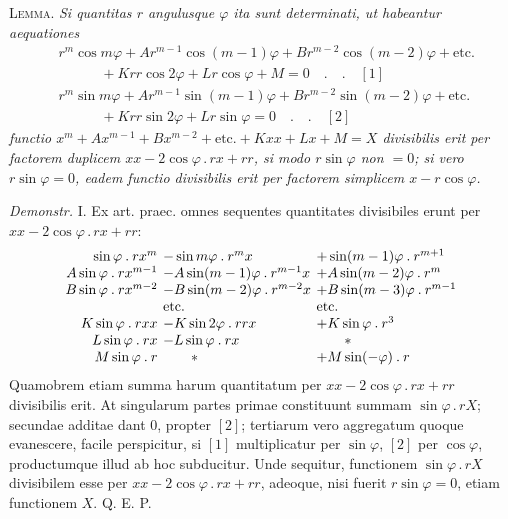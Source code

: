 \textsc{Lemma.} \textit{Si quantitas $r$ angulusque $\varphi$ ita sunt determinati, ut habeantur aequationes}
\[
\begin{aligned}
&r^m\cos m\varphi+Ar^{m-1}\cos(m-1)\varphi+Br^{m-2}\cos(m-2)\varphi+\text{etc.}\\
&\hspace{3em}+Krr\cos2\varphi+Lr\cos\varphi+M=0\quad.\quad.\quad[1]\\
&r^m\sin m\varphi+Ar^{m-1}\sin(m-1)\varphi+Br^{m-2}\sin(m-2)\varphi+\text{etc.}\\
&\hspace{3em}+Krr\sin2\varphi+Lr\sin\varphi=0\quad.\quad.\quad[2]
\end{aligned}
\]
\textit{functio $x^m+Ax^{m-1}+Bx^{m-2}+\text{etc.}+Kxx+Lx+M=X$ divisibilis erit per factorem duplicem $xx-2\cos\varphi\mathbin{.}rx+rr$, si modo $r\sin\varphi$ non $=0$; si vero $r\sin\varphi=0$, eadem functio divisibilis erit per factorem simplicem $x-r\cos\varphi$.}

\textit{Demonstr.} I. Ex art. praec. omnes sequentes quantitates divisibiles erunt per $xx-2\cos\varphi\mathbin{.}rx+rr$:
{\small
\[
\setlength{\arraycolsep}{2pt}
\begin{array}{rll}
\sin\varphi\mathbin{.}rx^m&-\sin m\varphi\mathbin{.}r^m x&+\sin(m-1)\varphi\mathbin{.}r^{m+1}\\
A\sin\varphi\mathbin{.}rx^{m-1}&-A\sin(m-1)\varphi\mathbin{.}r^{m-1}x&+A\sin(m-2)\varphi\mathbin{.}r^m\\
B\sin\varphi\mathbin{.}rx^{m-2}&-B\sin(m-2)\varphi\mathbin{.}r^{m-2}x&+B\sin(m-3)\varphi\mathbin{.}r^{m-1}\\
&\text{etc.}&\text{etc.}\\
K\sin\varphi\mathbin{.}rxx&-K\sin2\varphi\mathbin{.}rrx&+K\sin\varphi\mathbin{.}r^3\\
L\sin\varphi\mathbin{.}rx&-L\sin\varphi\mathbin{.}rx&\qquad *\\
M\sin\varphi\mathbin{.}r&\qquad *&+M\sin(-\varphi)\mathbin{.}r
\end{array}
\]
}
Quamobrem etiam summa harum quantitatum per $xx-2\cos\varphi\mathbin{.}rx+rr$ divisibilis erit. At singularum partes primae constituunt summam $\sin\varphi\mathbin{.}rX$; secundae additae dant $0$, propter $[2]$; tertiarum vero aggregatum quoque evanescere, facile perspicitur, si $[1]$ multiplicatur per $\sin\varphi$, $[2]$ per $\cos\varphi$, productumque illud ab hoc subducitur. Unde sequitur, functionem $\sin\varphi\mathbin{.}rX$ divisibilem esse per $xx-2\cos\varphi\mathbin{.}rx+rr$, adeoque, nisi fuerit $r\sin\varphi=0$, etiam functionem $X$. Q. E. P.

